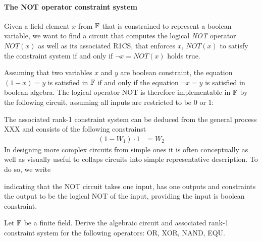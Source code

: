 \paragraph{The NOT operator constraint system} Given a field element $x$ from $\mathbb{F}$ that is constrained to represent a boolean variable, we want to find a circuit that computes the logical \textit{NOT} operator $NOT(x)$ as well as its associated R1CS, that enforces $x$, $NOT(x)$ to satisfy the constraint system if and only if $\lnot x = NOT(x)$ holds true. 

Assuming that two variables $x$ and $y$ are boolean constraint, the equation $(1-x) = y$ is satisfied in $\mathbb{F}$ if and only if the equation $\lnot x = y$ is satisfied in boolean algebra. The logical operator NOT is therefore implementable in $\mathbb{F}$ by the following circuit, assuming all inputs are restricted to be $0$ or $1$:
\begin{center}
\end{center}
The associated rank-1 constraint system can be deduced from the general process XXX and consists of the following constrainst
\begin{align*}
  (1-W_1)\cdot 1 &= W_2
\end{align*}
In designing more complex circuits from simple ones it is often conceptually as well as visually useful to collaps circuits into simple representative description. To do so, we write 
\begin{center}
\end{center}
indicating that the NOT circuit takes one input, has one outputs and constraints the output to be the logical NOT of the input, providing the input is boolean constraint.
\begin{exercise}
Let $\mathbb{F}$ be a finite field. Derive the algebraic circuit and associated rank-1 constraint system for the following operators: OR, XOR, NAND, EQU.
\end{exercise}
